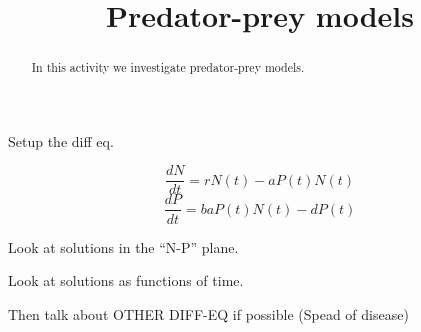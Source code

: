 \documentclass{ximera}
\title{Predator-prey models}
\begin{document}
\begin{abstract}
In this activity we investigate predator-prey models.
\end{abstract}
\maketitle


Setup the diff eq. 

\[
\frac{dN}{dt} = rN(t) -a P(t)N(t)
\]
\[
\frac{dP}{dt} = baP(t)N(t) -dP(t)
\]

Look at solutions in the ``N-P'' plane. 

Look at solutions as functions of time. 


Then talk about OTHER DIFF-EQ if possible 
(Spead of disease) 
\end{document}
